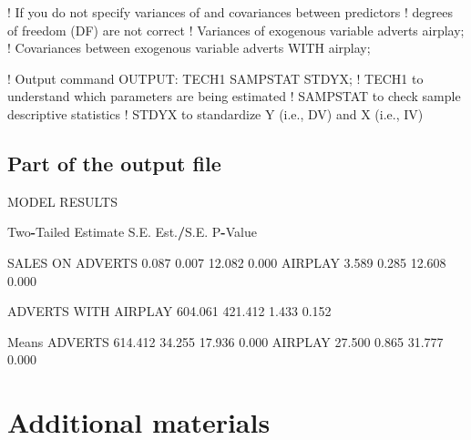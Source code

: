 \documentclass[
]{book}
\newenvironment{Shaded}{\begin{snugshade}}{\end{snugshade}}
\newcommand{\FloatTok}[1]{\textcolor[rgb]{0.00,0.00,0.81}{#1}}
\newcommand{\NormalTok}[1]{#1}
\newcommand{\SpecialCharTok}[1]{\textcolor[rgb]{0.81,0.36,0.00}{\textbf{#1}}}
\newcommand{\StringTok}[1]{\textcolor[rgb]{0.31,0.60,0.02}{#1}}
\begin{document}
\begin{Shaded}
\begin{Highlighting}[]
\StringTok{    ! If you do not specify variances of and covariances between predictors}
\StringTok{    ! degrees of freedom (DF) are not correct}
\StringTok{    ! Variances of exogenous variable}
\StringTok{    adverts airplay;}
\StringTok{    ! Covariances between exogenous variable}
\StringTok{    adverts WITH airplay;}

\StringTok{! Output command}
\StringTok{OUTPUT:}
\StringTok{    TECH1 SAMPSTAT STDYX;}
\StringTok{    ! TECH1 to understand which parameters are being estimated}
\StringTok{    ! SAMPSTAT to check sample descriptive statistics}
\StringTok{    ! STDYX to standardize Y (i.e., DV) and X (i.e., IV)}
\end{Highlighting}
\end{Shaded}

\hypertarget{part-of-the-output-file}{%
\subsection{Part of the output file}\label{part-of-the-output-file}}

\begin{Shaded}
\begin{Highlighting}[]
\NormalTok{MODEL RESULTS}

\NormalTok{                                                    Two}\SpecialCharTok{{-}}\NormalTok{Tailed}
\NormalTok{                    Estimate       S.E.  Est.}\SpecialCharTok{/}\NormalTok{S.E.    P}\SpecialCharTok{{-}}\NormalTok{Value}

\NormalTok{ SALES    ON}
\NormalTok{    ADVERTS            }\FloatTok{0.087}      \FloatTok{0.007}     \FloatTok{12.082}      \FloatTok{0.000}
\NormalTok{    AIRPLAY            }\FloatTok{3.589}      \FloatTok{0.285}     \FloatTok{12.608}      \FloatTok{0.000}

\NormalTok{ ADVERTS  WITH}
\NormalTok{    AIRPLAY          }\FloatTok{604.061}    \FloatTok{421.412}      \FloatTok{1.433}      \FloatTok{0.152}

\NormalTok{ Means}
\NormalTok{    ADVERTS          }\FloatTok{614.412}     \FloatTok{34.255}     \FloatTok{17.936}      \FloatTok{0.000}
\NormalTok{    AIRPLAY           }\FloatTok{27.500}      \FloatTok{0.865}     \FloatTok{31.777}      \FloatTok{0.000}
\end{Highlighting}
\end{Shaded}

\hypertarget{additional-materials}{%
\section{Additional materials}\label{additional-materials}}
\end{document}
